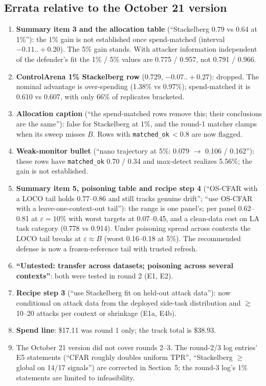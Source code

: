 \documentclass[11pt]{article}
\begin{document}
\subsection{Errata relative to the October 21 version}
\begin{enumerate}
\item \textbf{Summary item 3 and the allocation table} (``Stackelberg 0.79 vs 0.64 at 1\%''): the 1\% gain is not established once spend-matched (interval $-0.11..+0.20$). The 5\% gain stands. With attacker information independent of the defender's fit the 1\% / 5\% values are 0.775 / 0.957, not 0.791 / 0.966.
\item \textbf{ControlArena 1\% Stackelberg row} (0.729, $-0.07..+0.27$): dropped. The nominal advantage is over-spending (1.38\% vs 0.97\%); spend-matched it is 0.610 vs 0.607, with only 66\% of replicates bracketed.
\item \textbf{Allocation caption} (``the spend-matched rows remove this; their conclusions are the same''): false for Stackelberg at 1\%, and the round-1 matcher clamps when its sweep misses $B$. Rows with \texttt{matched\_ok}$\,<0.8$ are now flagged.
\item \textbf{Weak-monitor bullet} (``nano trajectory at 5\%: 0.079 $\to$ 0.106 / 0.162''): these rows have \texttt{matched\_ok} 0.70 / 0.34 and max-detect realizes 5.56\%; the gain is not established.
\item \textbf{Summary item 5, poisoning table and recipe step 4} (``OS-CFAR with a LOCO tail holds 0.77--0.86 and still tracks genuine drift''; ``use OS-CFAR with a leave-one-context-out tail''): the range is one panel's; per panel 0.62--0.81 at $\varepsilon=10\%$ with worst targets at 0.07--0.45, and a clean-data cost on LA task category (0.778 vs 0.914). Under poisoning spread across contexts the LOCO tail breaks at $\varepsilon\approx B$ (worst 0.16--0.18 at 5\%). The recommended defense is now a frozen-reference tail with trusted refresh.
\item \textbf{``Untested: transfer across datasets; poisoning across several contexts''}: both were tested in round 2 (E1, E2).
\item \textbf{Recipe step 3} (``use Stackelberg fit on held-out attack data''): now conditional on attack data from the deployed side-task distribution and $\gtrsim$10--20 attacks per context or shrinkage (E1a, E4b).
\item \textbf{Spend line}: \$17.11 was round 1 only; the track total is \$38.93.
\item The October 21 version did not cover rounds 2--3. The round-2/3 log entries' E5 statements (``CFAR roughly doubles uniform TPR'', ``Stackelberg $\ge$ global on 14/17 signals'') are corrected in Section~5; the round-3 log's 1\% statements are limited to infeasibility.
\end{enumerate}
\end{document}
